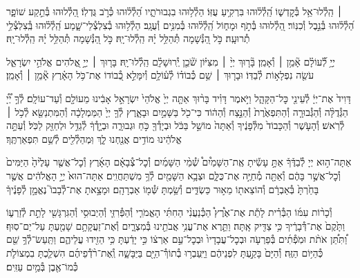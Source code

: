 \documentclass[twoside, openany, parskip=half, 11pt]{book}
\begin{document}
 ׀ \hfill
הַֽלְ֯לוּ־אֵ֥ל בְּ֯קׇדְשׁ֑וֹ הַֽ֝לְ֯ל֗וּהוּ בִּרְקִ֥יעַ עֻזּֽוֹ׃
הַלְ֯ל֥וּהוּ בִגְבוּרֹתָ֑יו הַ֝לְ֯ל֗וּהוּ כְּ֯רֹ֣ב גֻּדְלֽוֹ׃
הַ֭לְ֯לוּהוּ בְּ֯תֵ֣קַע שׁוֹפָ֑ר הַ֝לְ֯ל֗וּהוּ בְּ֯נֵ֣בֶל וְ֯כִנּֽוֹר׃
הַ֭לְ֯לוּהוּ בְּ֯תֹ֣ף וּמָח֑וֹל הַֽ֝לְ֯ל֗וּהוּ בְּ֯מִנִּ֥ים וְ֯עֻגָֽב׃
הַלְ֯ל֥וּהוּ בְ֯צִלְצְ֯לֵי־שָׁ֑מַע הַֽ֝לְ֯ל֗וּהוּ בְּֽ֯צִלְצְ֯לֵ֥י תְ֯רוּעָֽה׃
כֹּ֣ל הַ֭נְּ֯שָׁמָה תְּ֯הַלֵּ֥ל יָ֗הּ הַֽלְ֯לוּ־יָֽהּ׃
\scriptsize{כֹּ֣ל הַ֭נְּ֯שָׁמָה תְּ֯הַלֵּ֥ל יָ֗הּ הַֽלְ֯לוּ־יָֽהּ׃ \\}
\normalsize{}

\negline

יְיָ֥ לְ֯֝עוֹלָ֗ם אָ֘מֵ֥ן ׀ וְ֯אָמֵֽן׃ \hfill \break
{}בָּ֘ר֤וּךְ יְיָ֨ ׀ מִצִּיּ֗וֹן שֹׁ֘כֵ֤ן יְֽ֯רוּשָׁלָ֗‍ִם הַֽלְ֯לוּ־יָֽהּ׃ \hfill \break
{}בָּר֤וּךְ ׀ יְיָ֣ אֱ֭לֹהִים אֱלֹהֵ֣י יִשְׂרָאֵ֑ל עֹשֵׂ֖ה נִפְלָא֣וֹת לְ֯בַדּֽוֹ׃ \hfill \break
וּבָר֤וּךְ ׀ שֵׁ֥ם כְּ֯בוֹד֗וֹ לְ֯ע֫וֹלָ֥ם וְ֯יִמָּלֵ֣א כְ֭֯בוֹדוֹ אֶת־כֹּ֥ל הָאָ֗רֶץ אָ֘מֵ֥ן ׀ וְ֯אָמֵֽן׃





דָּוִיד֙ אֶת־יְיָ֔ לְ֯עֵינֵ֖י כׇּל־הַקָּהָ֑ל וַיֹּ֣אמֶר דָּוִ֗יד בָּר֨וּךְ אַתָּ֤ה יְיָ֙ אֱלֹהֵי֙ יִשְׂרָאֵ֣ל אָבִ֔ינוּ מֵעוֹלָ֖ם וְ֯עַד־עוֹלָֽם׃
לְ֯ךָ֣ יְ֠יָ֠ הַגְּ֯דֻלָּ֨ה וְ֯הַגְּ֯בוּרָ֤ה וְ֯הַתִּפְאֶ֙רֶת֙ וְ֯הַנֵּ֣צַח וְ֯הַה֔וֹד כִּי־כֹ֖ל בַּשָּׁמַ֣יִם וּבָאָ֑רֶץ לְ֯ךָ֤ יְיָ֙ הַמַּמְלָכָ֔ה וְ֯הַמִּתְנַשֵּׂ֖א לְ֯כֹ֥ל ׀ לְ֯רֹֽאשׁ׃
וְ֯הָעֹ֤שֶׁר וְ֯הַכָּבוֹד֙ מִלְּ֯פָנֶ֔יךָ וְ֯אַתָּה֙ מוֹשֵׁ֣ל בַּכֹּ֔ל וּבְיָדְ֯ךָ֖ כֹּ֣חַ וּגְבוּרָ֑ה וּבְיָ֣דְ֯ךָ֔ לְ֯גַדֵּ֥ל וּלְחַזֵּ֖ק לַכֹּֽל׃
וְ֯עַתָּ֣ה אֱלֹהֵ֔ינוּ מוֹדִ֥ים אֲנַ֖חְנוּ לָ֑ךְ וּֽמְהַלְ֯לִ֖ים לְ֯שֵׁ֥ם תִּפְאַרְתֶּֽךָ׃





אַתָּה־ה֣וּא
יְיָ לְ֯בַדֶּ֒ךָ֒ אַתָּ֣ עָשִׂ֡יתָ אֶֽת־הַשָּׁמַ֩יִם֩ שְׁ֯מֵ֨י הַשָּׁמַ֜יִם וְ֯כׇל־צְ֯בָאָ֗ם הָאָ֜רֶץ וְ֯כׇל־אֲשֶׁ֤ר עָלֶ֙יהָ֙ הַיַּמִּים֙ וְ֯כׇל־אֲשֶׁ֣ר בָּהֶ֔ם וְ֯אַתָּ֖ה מְ֯חַיֶּ֣ה אֶת־כֻּלָּ֑ם וּצְבָ֥א הַשָּׁמַ֖יִם לְ֯ךָ֥ מִשְׁתַּחֲוִֽים׃
אַתָּה־הוּא֙ יְיָ֣ הָאֱלֹהִ֔ים אֲשֶׁ֤ר בָּחַ֙רְתָּ֙ בְּ֯אַבְרָ֔ם וְ֯הוֹצֵאת֖וֹ מֵא֣וּר כַּשְׂדִּ֑ים וְ֯שַׂ֥מְתָּ שְּׁ֯מ֖וֹ אַבְרָהָֽם׃ וּמָצָ֣אתָ אֶת־לְ֯בָבוֹ֮ נֶאֱמָ֣ן לְ֯פָנֶ֒יךָ֒

וְ֯כָר֨וֹת עִמּ֜וֹ הַבְּ֯רִ֗ית לָתֵ֡ת אֶת־אֶ֩רֶץ֩ הַכְּ֯נַעֲנִ֨י הַחִתִּ֜י הָאֱמֹרִ֧י וְ֯הַפְּ֯רִזִּ֛י וְ֯הַיְבוּסִ֥י וְ֯הַגִּרְגָּשִׁ֖י לָתֵ֣ת לְ֯זַרְע֑וֹ וַתָּ֙קֶם֙ אֶת־דְּ֯בָרֶ֔יךָ כִּ֥י צַדִּ֖יק אָֽתָּה׃ וַתֵּ֛רֶא אֶת־עֳנִ֥י אֲבֹתֵ֖ינוּ בְּ֯מִצְרָ֑יִם וְ֯אֶת־זַעֲקָתָ֥ם שָׁמַ֖עְתָּ עַל־יַם־סֽוּף׃ וַ֠תִּתֵּ֠ן אֹתֹ֨ת וּמֹֽפְ֯תִ֜ים בְּ֯פַרְעֹ֤ה וּבְכׇל־עֲבָדָיו֙ וּבְכׇל־עַ֣ם אַרְצ֔וֹ כִּ֣י יָדַ֔עְתָּ כִּ֥י הֵזִ֖ידוּ עֲלֵיהֶ֑ם וַתַּֽעַשׂ־לְ֯ךָ֥ שֵׁ֖ם כְּ֯הַיּ֥וֹם הַזֶּֽה׃
וְ֯הַיָּם֙ בָּקַ֣עְתָּ לִפְנֵיהֶ֔ם וַיַּֽעַבְר֥וּ בְ֯תוֹךְ֯־הַיָּ֖ם בַּיַּבָּשָׁ֑ה וְֽ֯אֶת־רֹ֨דְ֯פֵיהֶ֜ם הִשְׁלַ֧כְתָּ בִמְצוֹלֹ֛ת כְּ֯מוֹ־אֶ֖בֶן בְּ֯מַ֥יִם עַזִּֽים׃
\end{document}
